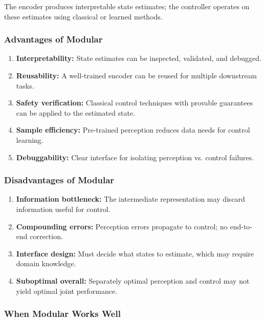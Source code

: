 The encoder produces interpretable state estimates; the controller operates on these estimates using classical or learned methods.

\subsubsection{Advantages of Modular}

\begin{enumerate}
    \item \textbf{Interpretability:} State estimates can be inspected, validated, and debugged.

    \item \textbf{Reusability:} A well-trained encoder can be reused for multiple downstream tasks.

    \item \textbf{Safety verification:} Classical control techniques with provable guarantees can be applied to the estimated state.

    \item \textbf{Sample efficiency:} Pre-trained perception reduces data needs for control learning.

    \item \textbf{Debuggability:} Clear interface for isolating perception vs. control failures.
\end{enumerate}

\subsubsection{Disadvantages of Modular}

\begin{enumerate}
    \item \textbf{Information bottleneck:} The intermediate representation may discard information useful for control.

    \item \textbf{Compounding errors:} Perception errors propagate to control; no end-to-end correction.

    \item \textbf{Interface design:} Must decide what states to estimate, which may require domain knowledge.

    \item \textbf{Suboptimal overall:} Separately optimal perception and control may not yield optimal joint performance.
\end{enumerate}

\subsubsection{When Modular Works Well}

